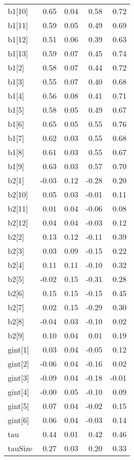 \documentclass[12pt,]{article}
\begin{document}
\begin{table}[ht]
{\begin{tabular}{lrrrr}
  b1[10] & 0.65 & 0.04 & 0.58 & 0.72 \\ 
  b1[11] & 0.59 & 0.05 & 0.49 & 0.69 \\ 
  b1[12] & 0.51 & 0.06 & 0.39 & 0.63 \\ 
  b1[13] & 0.59 & 0.07 & 0.45 & 0.74 \\ 
  b1[2] & 0.58 & 0.07 & 0.44 & 0.72 \\ 
  b1[3] & 0.55 & 0.07 & 0.40 & 0.68 \\ 
  b1[4] & 0.56 & 0.08 & 0.41 & 0.71 \\ 
  b1[5] & 0.58 & 0.05 & 0.49 & 0.67 \\ 
  b1[6] & 0.65 & 0.05 & 0.55 & 0.76 \\ 
  b1[7] & 0.62 & 0.03 & 0.55 & 0.68 \\ 
  b1[8] & 0.61 & 0.03 & 0.55 & 0.67 \\ 
  b1[9] & 0.63 & 0.03 & 0.57 & 0.70 \\ 
  b2[1] & -0.03 & 0.12 & -0.28 & 0.20 \\ 
  b2[10] & 0.05 & 0.03 & -0.01 & 0.11 \\ 
  b2[11] & 0.01 & 0.04 & -0.06 & 0.08 \\ 
  b2[12] & 0.04 & 0.04 & -0.03 & 0.12 \\ 
  b2[2] & 0.13 & 0.12 & -0.11 & 0.39 \\ 
  b2[3] & 0.03 & 0.09 & -0.15 & 0.22 \\ 
  b2[4] & 0.11 & 0.11 & -0.10 & 0.32 \\ 
  b2[5] & -0.02 & 0.15 & -0.31 & 0.28 \\ 
  b2[6] & 0.15 & 0.15 & -0.15 & 0.45 \\ 
  b2[7] & 0.02 & 0.15 & -0.29 & 0.30 \\ 
  b2[8] & -0.04 & 0.03 & -0.10 & 0.02 \\ 
  b2[9] & 0.10 & 0.04 & 0.01 & 0.19 \\ 
  gint[1] & 0.03 & 0.04 & -0.05 & 0.12 \\ 
  gint[2] & -0.06 & 0.04 & -0.16 & 0.02 \\ 
  gint[3] & -0.09 & 0.04 & -0.18 & -0.01 \\ 
  gint[4] & -0.00 & 0.05 & -0.10 & 0.09 \\ 
  gint[5] & 0.07 & 0.04 & -0.02 & 0.15 \\ 
  gint[6] & 0.06 & 0.04 & -0.03 & 0.14 \\ 
  tau & 0.44 & 0.01 & 0.42 & 0.46 \\ 
  tauSize & 0.27 & 0.03 & 0.20 & 0.33 \\ 

\end{tabular}}
\end{table}
\end{document}

